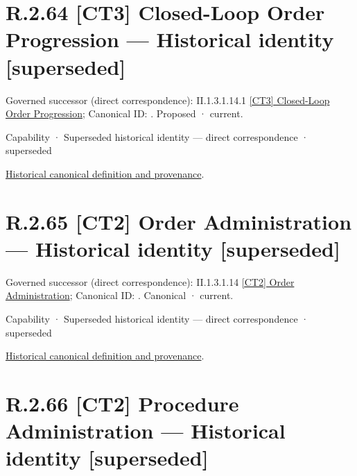 \section*{R.2.64 [CT3] Closed-Loop Order Progression — Historical identity [superseded]}
\label{navigation:R.2.64}

{\small Governed successor (direct correspondence): II.1.3.1.14.1 \hyperref[element:2f79ebd7392c46ef92def6f25bc9c7ce]{[CT3] Closed-Loop Order Progression}; Canonical ID: \texttt{}. Proposed · current.}\par
\label{element:2ad29cebc1e94053a300d869e7797232}
{\small Capability · Superseded historical identity — direct correspondence · superseded}\par
\href{../../../../../../../continuum/strategy/capability/2ad29cebc1e94053a300d869e7797232.md}{Historical canonical definition and provenance}.\par
\section*{R.2.65 [CT2] Order Administration — Historical identity [superseded]}
\label{navigation:R.2.65}

{\small Governed successor (direct correspondence): II.1.3.1.14 \hyperref[element:c3c5abd7987f4433a46cbfed8167914c]{[CT2] Order Administration}; Canonical ID: \texttt{}. Canonical · current.}\par
\label{element:ebb735a2915744819d4001d9b8425cc6}
{\small Capability · Superseded historical identity — direct correspondence · superseded}\par
\href{../../../../../../../continuum/strategy/capability/ebb735a2915744819d4001d9b8425cc6.md}{Historical canonical definition and provenance}.\par
\section*{R.2.66 [CT2] Procedure Administration — Historical identity [superseded]}
\label{navigation:R.2.66}

